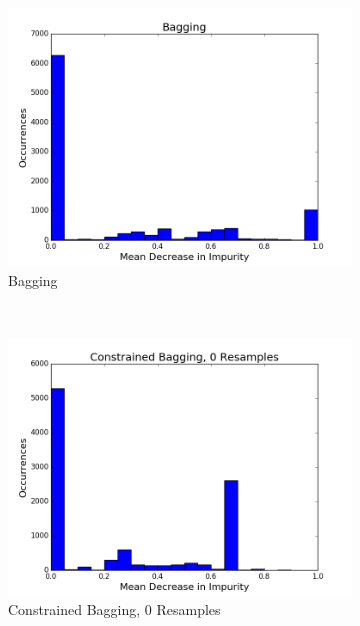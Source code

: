 \begin{figure}[h!]
  \centering
  \begin{subfigure}[b]{0.45\textwidth}
    \includegraphics[width=\textwidth]{figures/random_forests/bagging_bias_bagging_hist.png}
    \caption{Bagging}
    \label{fig:bagging-bias-bagging}
  \end{subfigure}
  ~
  \begin{subfigure}[b]{0.45\textwidth}
    \includegraphics[width=\textwidth]{figures/random_forests/bagging_bias_no_bagging_hist.png}
    \caption{Constrained Bagging, 0 Resamples}
    \label{fig:bagging-bias-constrained-0}
  \end{subfigure}
  ~
  \begin{subfigure}[b]{0.45\textwidth}

\end{subfigure}
\end{figure}
